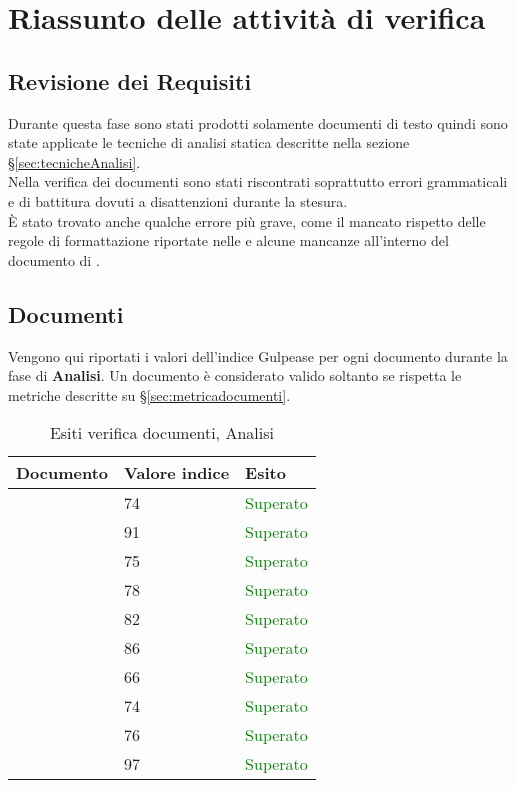 \section{Riassunto delle attività di verifica}{
\subsection{Revisione dei Requisiti}{

Durante questa fase sono stati prodotti solamente documenti di testo quindi sono state applicate le tecniche di analisi statica descritte nella sezione \S\ref{sec:tecnicheAnalisi}.\\
Nella verifica dei documenti sono stati riscontrati soprattutto errori grammaticali e di battitura dovuti a disattenzioni durante la stesura.\\
È stato trovato anche qualche errore più grave, come il mancato rispetto delle regole di formattazione riportate nelle \NormeDiProgetto e alcune mancanze all'interno del documento di \AnalisiDeiRequisiti.\\
}
\subsection{Documenti}{
Vengono qui riportati i valori dell’indice Gulpease per ogni documento durante la fase di \textbf{Analisi}. Un documento è considerato valido soltanto se rispetta le metriche descritte su \S\ref{sec:metricadocumenti}.

\begin{table}[H]
	\centering
	\begin{tabular}{p{}p{}
			p{}}
		\toprule Documento & Valore indice & Esito \\
		\midrule
		\PianoDiProgetto & 74 & \textcolor{green}{Superato} \\
		\AnalisiDeiRequisiti & 91 & \textcolor{green}{Superato} \\
		\NormeDiProgetto & 75 & \textcolor{green}{Superato} \\
		\PianoDiQualifica & 78 & \textcolor{green}{Superato} \\
		\StudioDiFattibilita & 82 & \textcolor{green}{Superato} \\
		\SpecificaTecnica & 86 & \textcolor{green}{Superato}\\
		\ManualeUtente & 66 & \textcolor{green}{Superato}\\
		\ManualeAmministratore & 74 & \textcolor{green}{Superato}\\
		\DefinizioneDelProdotto & 76 & \textcolor{green}{Superato}\\
		\Glossario & 97 & \textcolor{green}{Superato} \\
		\bottomrule
	\end{tabular}
	\label{tab:costorequisiti}
	\caption{Esiti verifica documenti, Analisi}
\end{table}

}}
